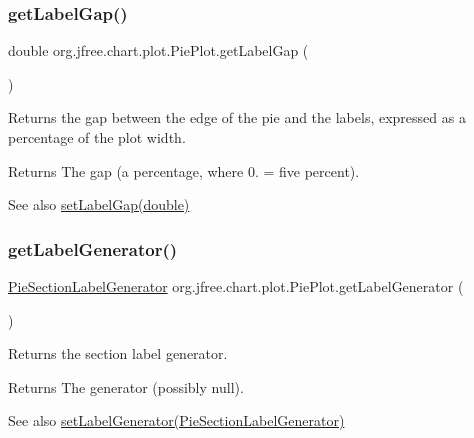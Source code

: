 \subsubsection{\texorpdfstring{get\+Label\+Gap()}{getLabelGap()}}
{\footnotesize\ttfamily double org.\+jfree.\+chart.\+plot.\+Pie\+Plot.\+get\+Label\+Gap (\begin{DoxyParamCaption}{ }\end{DoxyParamCaption})}

Returns the gap between the edge of the pie and the labels, expressed as a percentage of the plot width.

\begin{DoxyReturn}{Returns}
The gap (a percentage, where 0. = five percent).
\end{DoxyReturn}
\begin{DoxySeeAlso}{See also}
\mbox{\hyperlink{classorg_1_1jfree_1_1chart_1_1plot_1_1_pie_plot_a0478fb7b65d5556cb402dac28991c88b}{set\+Label\+Gap(double)}} 
\end{DoxySeeAlso}
\mbox{\label{classorg_1_1jfree_1_1chart_1_1plot_1_1_pie_plot_a4468c4b622678866bd5fc13c1c2bca50}} 
\subsubsection{\texorpdfstring{get\+Label\+Generator()}{getLabelGenerator()}}
{\footnotesize\ttfamily \mbox{\hyperlink{interfaceorg_1_1jfree_1_1chart_1_1labels_1_1_pie_section_label_generator}{Pie\+Section\+Label\+Generator}} org.\+jfree.\+chart.\+plot.\+Pie\+Plot.\+get\+Label\+Generator (\begin{DoxyParamCaption}{ }\end{DoxyParamCaption})}

Returns the section label generator.

\begin{DoxyReturn}{Returns}
The generator (possibly {\ttfamily null}).
\end{DoxyReturn}
\begin{DoxySeeAlso}{See also}
\mbox{\hyperlink{classorg_1_1jfree_1_1chart_1_1plot_1_1_pie_plot_accf30f5f996861a0ec3ec133a3577ce3}{set\+Label\+Generator(\+Pie\+Section\+Label\+Generator)}} 
\end{DoxySeeAlso}
\mbox{\label{classorg_1_1jfree_1_1chart_1_1plot_1_1_pie_plot_a7eabe09e7a9aac61bfd229a8d107af12}} 
